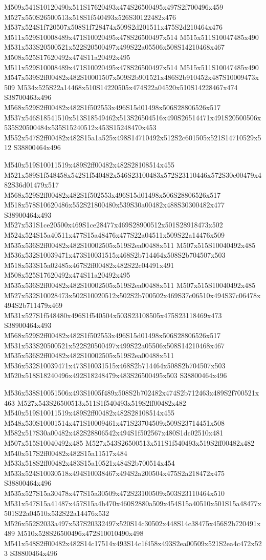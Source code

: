 \documentclass{article}
\begin{document}
\begin{multicols}{2}
M509x541S10120490x511S17620493x474S26500495x497S2f700496x459 M527x550S26500513x518S1f540493x526S30122482x476 M537x524S1f720507x508S1f728474x509S2d201511x475S2d210464x476 M511x529S10008489x471S10020495x478S26500497x514 M515x511S10047485x490 M531x533S20500521x522S20500497x499S22a05506x508S14210468x467 M508x525S17620492x474S11a20492x495 M511x529S10008489x471S10020495x478S26500497x514 M515x511S10047485x490 M547x539S2ff00482x482S10001507x509S2b901521x486S2b910452x487S10009473x509 M534x525S22a14468x510S14220505x474S22a04520x510S14228467x474 S38700463x496 M568x529S2ff00482x482S1f502553x496S15d01498x506S28806526x517 M537x546S18541510x513S18549462x513S26504516x490S26514471x491S20500506x535S20500484x535S15240512x453S15248470x453 M552x547S2ff00482x482S15a1a525x498S14710492x512S2c601505x521S14710529x512 S38800464x496

M540x519S10011519x489S2ff00482x482S28108514x455 M521x589S1f548458x542S1f540482x546S23100483x572S23110446x572S30e00479x482S36d01479x517 M568x529S2ff00482x482S1f502553x496S15d01498x506S28806526x517 M518x578S10620486x552S21800480x539S30a00482x488S30300482x477 S38900464x493 M527x531S1ce20500x469S1ce28477x469S28900512x501S28918473x502 M524x524S15a40511x477S15a48476x477S22a04511x509S22a14476x509 M535x536S2ff00482x482S10002505x519S2ea00488x511 M507x515S10040492x485 M536x532S10039471x473S10031515x468S2b714464x508S2b704507x503 M518x533S15a02485x467S2ff00482x482S22c04491x491 M508x525S17620492x474S11a20492x495 M535x536S2ff00482x482S10002505x519S2ea00488x511 M507x515S10040492x485 M527x532S10028473x502S10020512x502S2b700502x469S37c06510x494S37c06478x494S2b711479x469 M531x527S1f548480x496S1f540504x503S23108505x475S23118469x473 S38900464x493 M568x529S2ff00482x482S1f502553x496S15d01498x506S28806526x517 M531x533S20500521x522S20500497x499S22a05506x508S14210468x467 M535x536S2ff00482x482S10002505x519S2ea00488x511 M536x532S10039471x473S10031515x468S2b714464x508S2b704507x503 M520x518S18240496x492S18248479x483S26500495x503 S38800464x496

M536x538S10051506x493S1005f489x508S2b702482x474S2b712463x489S2f700521x463 M527x543S26500513x511S1f540493x519S2ff00482x482 M540x519S10011519x489S2ff00482x482S28108514x455 M548x530S10001514x471S10009461x471S23704509x509S23714451x508 M582x517S30a00482x482S28806542x494S1f502567x480S1dc02510x481 M507x515S10040492x485 M527x543S26500513x511S1f540493x519S2ff00482x482 M540x517S2ff00482x482S15a11517x484 M533x518S2ff00482x483S15a10521x484S2b700514x454 M533x524S10030518x494S10038467x494S2a200504x475S2a218472x475 S38800464x496 M535x527S15a30478x477S15a30509x472S23100509x503S23110464x510 M531x547S15a41487x457S15a4b470x460S2880a509x454S15a40510x501S15a48477x501S22a04510x532S22a14476x532 M526x552S2033a497x537S20332497x520S14c30502x448S14c38475x456S2b720491x489 M510x528S26500496x472S10010490x498 M541x548S2ff00482x482S14c17514x493S14c1f458x493S2ea00509x521S2ea4c472x523 S38800464x496


\end{multicols}
\end{document}
